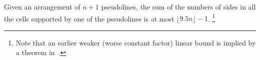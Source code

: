 \begin{theorem}\label{thm:zone-theorem-2}
Given an arrangement of \(n+1\) pseudolines,
%
%
the sum of the numbers of sides
%
in all the cells supported by one of the pseudolines
%
is at most \(\lfloor 9.5 n \rfloor - 1\).%
\footnote{%
Note that an earlier weaker (worse constant factor) linear bound is implied by
a theorem in~\cite{CGL85}.%
}
\end{theorem}
